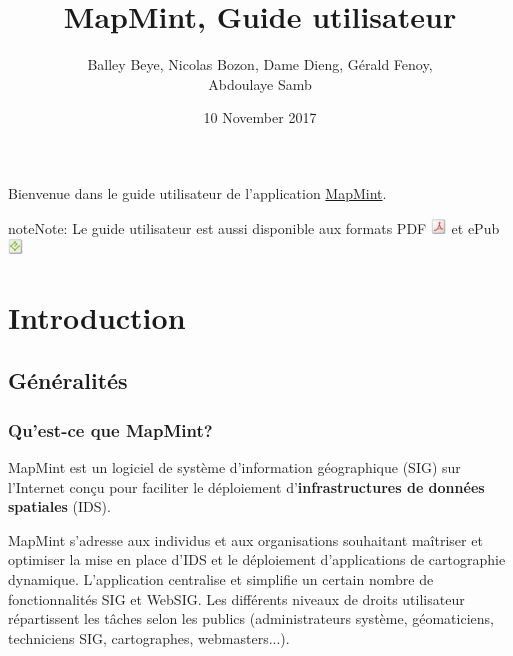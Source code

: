 \documentclass[letterpaper,10pt,french]{sphinxmanual}
\title{MapMint, Guide utilisateur}
\date{10 November 2017}
\author{Balley Beye, Nicolas Bozon, Dame Dieng, Gérald Fenoy, \\Abdoulaye Samb}
\begin{document}
\maketitle
\tableofcontents
{}\label{index::doc}


Bienvenue dans le guide utilisateur de l'application \href{http://mapmint.com}{MapMint}.

\begin{notice}{note}{Note:}
Le guide utilisateur est aussi disponible aux formats
PDF \includegraphics{pdf.png}  et ePub \includegraphics{epub.png}
\end{notice}


\chapter{Introduction}
\label{introduction/index:table-des-matieres}\label{introduction/index:home}\label{introduction/index::doc}\label{introduction/index:dashboard}\label{introduction/index:introduction}

\section{Généralités}
\label{introduction/introduction:generalites}\label{introduction/introduction::doc}\label{introduction/introduction:userguidegeneral}

\subsection{Qu’est-ce que MapMint?}
\label{introduction/introduction:quest-ce-que-mapmint}
MapMint est un logiciel de système d'information géographique (SIG) sur l'Internet  conçu pour faciliter le déploiement d'\textbf{infrastructures de données spatiales} (IDS).

MapMint s'adresse aux individus et aux organisations souhaitant maîtriser et optimiser la mise en place d'IDS et le déploiement d'applications de cartographie dynamique. L'application centralise et simplifie un certain nombre de fonctionnalités SIG et WebSIG. Les différents niveaux de droits utilisateur répartissent les tâches selon les publics (administrateurs système, géomaticiens, techniciens SIG, cartographes, webmasters...).
\end{document}
